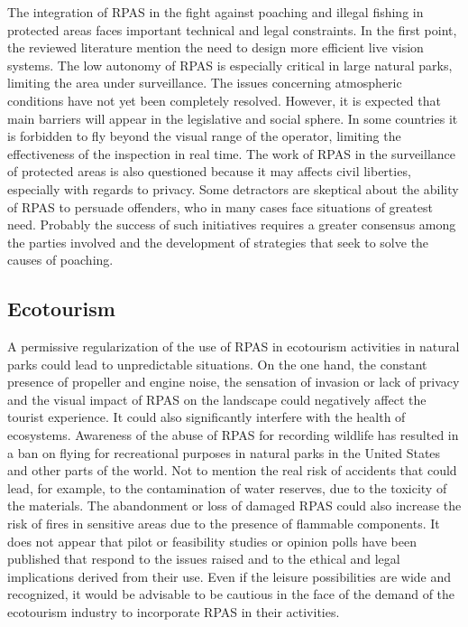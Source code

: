 \documentclass[]{interact}
\theoremstyle{plain}%
\theoremstyle{definition}
\theoremstyle{remark}
\begin{document}
The integration of RPAS in the fight against poaching and illegal
fishing in protected areas faces important technical and legal
constraints. In the first point, the reviewed literature mention the
need to design more efficient live vision systems. The low autonomy of
RPAS is especially critical in large natural parks, limiting the area
under surveillance. The issues concerning atmospheric conditions have
not yet been completely resolved. However, it is expected that main
barriers will appear in the legislative and social sphere. In some
countries it is forbidden to fly beyond the visual range of the
operator, limiting the effectiveness of the inspection in real time. The
work of RPAS in the surveillance of protected areas is also questioned
because it may affects civil liberties, especially with regards to
privacy. Some detractors are skeptical about the ability of RPAS to
persuade offenders, who in many cases face situations of greatest need.
Probably the success of such initiatives requires a greater consensus
among the parties involved and the development of strategies that seek
to solve the causes of poaching.

\subsection{Ecotourism}\label{ecotourism-1}

A permissive regularization of the use of RPAS in ecotourism activities
in natural parks could lead to unpredictable situations. On the one
hand, the constant presence of propeller and engine noise, the sensation
of invasion or lack of privacy and the visual impact of RPAS on the
landscape could negatively affect the tourist experience. It could also
significantly interfere with the health of ecosystems. Awareness of the
abuse of RPAS for recording wildlife has resulted in a ban on flying for
recreational purposes in natural parks in the United States and other
parts of the world. Not to mention the real risk of accidents that could
lead, for example, to the contamination of water reserves, due to the
toxicity of the materials. The abandonment or loss of damaged RPAS could
also increase the risk of fires in sensitive areas due to the presence
of flammable components. It does not appear that pilot or feasibility
studies or opinion polls have been published that respond to the issues
raised and to the ethical and legal implications derived from their use.
Even if the leisure possibilities are wide and recognized, it would be
advisable to be cautious in the face of the demand of the ecotourism
industry to incorporate RPAS in their activities.
\end{document}
